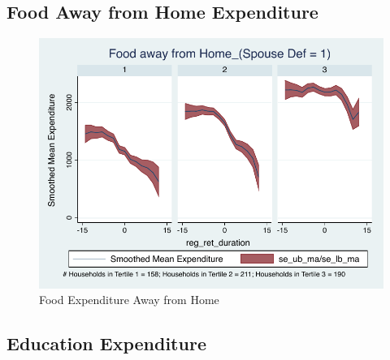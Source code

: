 \documentclass[a4paper]{article}
\begin{document}
%	




\clearpage

\subsection{Food Away from Home Expenditure}

\begin{table}[h]
	\centering
	
\end{table}

\begin{figure}[h]
	\caption{Food Expenditure Away from Home}
	\centering
	\includegraphics[width=1.0\textwidth]{../ConsumptionPostRetirement_by_SpouseDef_Cats/Smoothed/1/spouse_def_total_foodexp_away_real.pdf}
\end{figure}
\clearpage

\subsection{Education Expenditure}
\begin{table}[h]
	\centering
	
\end{table}
\end{document}

